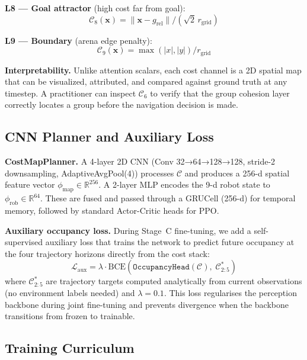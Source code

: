 \documentclass{article}
\begin{document}
\noindent\textbf{L8 — Goal attractor} (high cost far from goal):
\begin{equation}
  \mathcal{C}_{8}(\mathbf{x}) = \|\mathbf{x} - g_\text{rel}\| / (\sqrt{2}\, r_\text{grid})
\end{equation}

\noindent\textbf{L9 — Boundary} (arena edge penalty):
\begin{equation}
  \mathcal{C}_{9}(\mathbf{x}) = \max(|x|, |y|) / r_\text{grid}
\end{equation}

\vspace{0.3em}
\textbf{Interpretability.}
Unlike attention scalars, each cost channel is a 2D spatial map that can be
visualized, attributed, and compared against ground truth at any timestep.
A practitioner can inspect $\mathcal{C}_6$ to verify that the group cohesion
layer correctly locates a group before the navigation decision is made.

\subsection{CNN Planner and Auxiliary Loss}
\label{sec:planner}

\textbf{CostMapPlanner.}
A 4-layer 2D CNN (Conv 32→64→128→128, stride-2 downsampling, AdaptiveAvgPool(4))
processes $\mathcal{C}$ and produces a 256-d spatial feature vector
$\phi_\text{map} \in \mathbb{R}^{256}$.
A 2-layer MLP encodes the 9-d robot state to $\phi_\text{rob} \in \mathbb{R}^{64}$.
These are fused and passed through a GRUCell (256-d) for temporal memory,
followed by standard Actor-Critic heads for PPO.

\textbf{Auxiliary occupancy loss.}
During Stage~C fine-tuning, we add a self-supervised auxiliary loss that trains
the network to predict future occupancy at the four trajectory horizons directly
from the cost stack:
\begin{equation}
  \mathcal{L}_\text{aux} = \lambda\cdot\text{BCE}\!\left(\texttt{OccupancyHead}(\mathcal{C}),\; \mathcal{C}_{2:5}^*\right)
\end{equation}
where $\mathcal{C}_{2:5}^*$ are trajectory targets computed analytically from
current observations (no environment labels needed) and $\lambda=0.1$.
This loss regularises the perception backbone during joint fine-tuning and
prevents divergence when the backbone transitions from frozen to trainable.

\subsection{Training Curriculum}
\label{sec:training}
\end{document}
